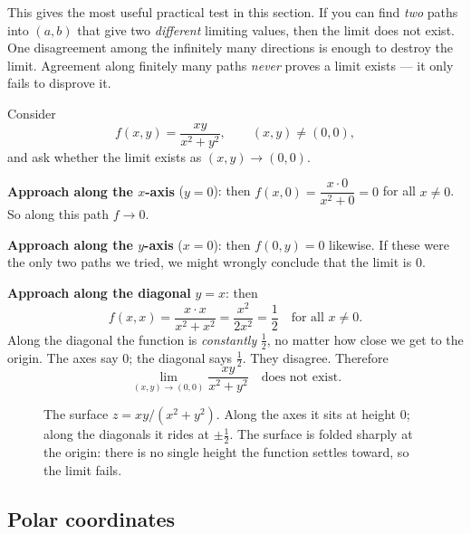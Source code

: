 This gives the most useful practical test in this section. If you can find \emph{two} paths
into $(a,b)$ that give two \emph{different}
limiting values, then the limit does not exist. One disagreement among the infinitely many
directions is enough to destroy the limit. Agreement along finitely many paths
\emph{never} proves a limit exists --- it only fails to disprove it.

\begin{example}
\label{ch32:ex-twopath}
Consider
\[
   f(x,y) = \frac{xy}{x^2+y^2}, \qquad (x,y)\neq(0,0),
\]
and ask whether the limit exists as $(x,y)\to(0,0)$.

\textbf{Approach along the $x$-axis} ($y=0$): then $f(x,0) = \dfrac{x\cdot 0}{x^2+0} = 0$ for
all $x\neq 0$. So along this path $f \to 0$.

\textbf{Approach along the $y$-axis} ($x=0$): then $f(0,y) = 0$ likewise. If these were the
only two paths we tried, we might wrongly conclude that the limit is $0$.

\textbf{Approach along the diagonal} $y=x$: then
\[
   f(x,x) = \frac{x\cdot x}{x^2 + x^2} = \frac{x^2}{2x^2} = \frac12
   \quad\text{for all } x\neq 0 .
\]
Along the diagonal the function is \emph{constantly} $\tfrac12$, no matter how close we get to
the origin. The axes say $0$; the diagonal says $\tfrac12$. They disagree. Therefore
\[
   \lim_{(x,y)\to(0,0)} \frac{xy}{x^2+y^2} \quad\text{does not exist.}
\]
\end{example}

\begin{figure}[H]
\centering
{}
\caption{The surface $z=xy/(x^2+y^2)$. Along the axes it sits at height $0$; along the diagonals
it rides at $\pm\tfrac12$. The surface is folded sharply at the origin: there is no single
height the function settles toward, so the limit fails.}
\label{ch32:fig-twopath}
\end{figure}

\subsection*{Polar coordinates}

